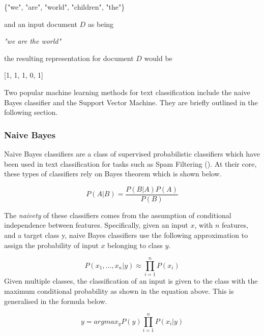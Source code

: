 \begin{center}
\{"we", "are", "world", "children", "the"\}
\end{center}

\noindent
\newline 
and an input document \(D\) as being 

\begin{center}
\textit{"we are the world"} 
\end{center}

\noindent
\newline
the resulting representation for document \(D\) would be

\begin{center}
 [1, 1, 1, 0, 1] 
\end{center}


\noindent
\newline
Two popular machine learning methods for text classification include the naive Bayes classifier and the Support Vector Machine. They are briefly outlined in the following section.

\subsubsection{Naive Bayes}
Naive Bayes classifiers are a class of supervised probabilistic classifiers which have been used in text classification for tasks such as Spam Filtering (\cite{Sahami1998}). At their core, these types of classifiers rely on Bayes theorem which is shown below.

\begin{equation}
P(A|B) = \dfrac{P(B|A)P(A)}{P(B)}
\end{equation}

\noindent
The \textit{naivety} of these classifiers comes from the assumption of conditional independence between features. Specifically, given an input \(x\), with \(n\) features, and a target class y, naive Bayes classifiers use the following approximation to assign the probability of input \(x\) belonging to class \(y\).

\begin{equation}
P(x_{1},...,x_{n}|y) \approx \prod_{i=1}^{n}P(x_{i})
\end{equation}
\noindent
Given multiple classes, the classification of an input is given to the class with the maximum conditional probability as shown in the equation above. This is generalised in the formula below.

\begin{equation}
y = argmax_{y} P(y) \prod_{i=1}^{n}P(x_{i} | y)
\end{equation}

